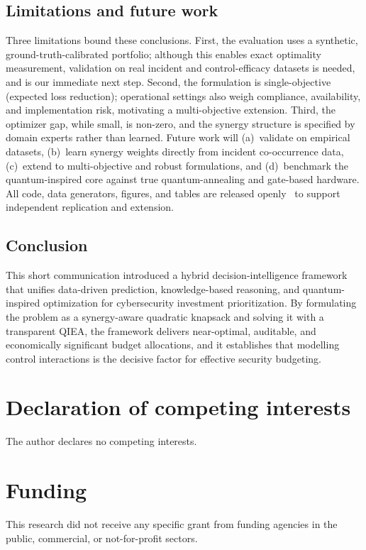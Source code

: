 \documentclass[preprint,12pt]{elsarticle}
\begin{document}
\subsection{Limitations and future work}
Three limitations bound these conclusions. First, the evaluation uses a synthetic,
ground-truth-calibrated portfolio; although this enables exact optimality measurement,
validation on real incident and control-efficacy datasets is needed, and is our immediate
next step. Second, the formulation is single-objective (expected loss reduction);
operational settings also weigh compliance, availability, and implementation risk,
motivating a multi-objective extension. Third, the optimizer gap, while small, is
non-zero, and the synergy structure is specified by domain experts rather than learned.
Future work will (a)~validate on empirical datasets, (b)~learn synergy weights directly
from incident co-occurrence data, (c)~extend to multi-objective and robust formulations,
and (d)~benchmark the quantum-inspired core against true quantum-annealing and gate-based
hardware. All code, data generators, figures, and tables are released openly~\cite{qaip2026}
to support independent replication and extension.

\subsection{Conclusion}
This short communication introduced a hybrid decision-intelligence framework that unifies
data-driven prediction, knowledge-based reasoning, and quantum-inspired optimization for
cybersecurity investment prioritization. By formulating the problem as a synergy-aware
quadratic knapsack and solving it with a transparent QIEA, the framework delivers
near-optimal, auditable, and economically significant budget allocations, and it
establishes that modelling control interactions is the decisive factor for effective
security budgeting.

\section*{Declaration of competing interests}
The author declares no competing interests.

\section*{Funding}
This research did not receive any specific grant from funding agencies in the public,
commercial, or not-for-profit sectors.
\end{document}
